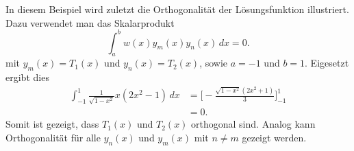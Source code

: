 \begin{beispiel}
	In diesem Beispiel wird zuletzt die Orthogonalität der Lösungsfunktion
	illustriert.
	Dazu verwendet man das Skalarprodukt
	\[
		\int_{a}^{b} w(x) y_m(x) y_n(x)\,dx = 0.
	\]
	mit $y_m(x) = T_1(x)$ und $y_n(x) = T_2(x)$, sowie $a=-1$ und $b = 1$.
	Eigesetzt ergibt dies
	\[
	\begin{aligned}
	\int_{-1}^{1} \frac{1}{\sqrt{1-x^2}} x (2x^2-1) \,dx &=
	\biggl [ - \frac{\sqrt{1-x^2}(2x^2+1)}{3} \biggr ]_{-1}^{1}\\
	&= 0.
	\end{aligned}
	\]
	Somit ist gezeigt, dass $T_1(x)$ und $T_2(x)$ orthogonal sind.
	Analog kann Orthogonalität für alle $y_n(x)$ und $y_m(x)$ mit $n \ne m$ gezeigt werden.
\end{beispiel}
